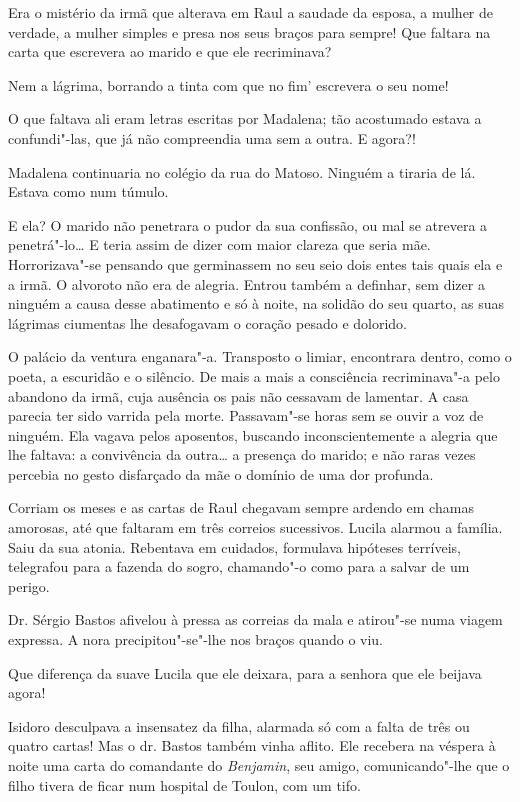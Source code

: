 Era o mistério da irmã que alterava em Raul a saudade da esposa, a
mulher de verdade, a mulher simples e presa nos seus braços para sempre!
Que faltara na carta que escrevera ao marido e que ele recriminava?

Nem a lágrima, borrando a tinta com que no
fim' escrevera o seu nome!

O que faltava ali eram letras escritas por Madalena; tão acostumado
estava a confundi"-las, que já não compreendia uma sem a outra. E agora?!

Madalena continuaria no colégio da rua do Matoso. Ninguém a tiraria de
lá. Estava como num túmulo.

E ela? O marido não penetrara o pudor da sua confissão, ou mal se
atrevera a penetrá"-lo\ldots{} E teria assim de dizer com maior clareza que
seria mãe. Horrorizava"-se pensando que germinassem no seu seio dois
entes tais quais ela e a irmã. O alvoroto não era de alegria. Entrou
também a definhar, sem dizer a ninguém a causa desse abatimento e só à
noite, na solidão do seu quarto, as suas lágrimas ciumentas lhe
desafogavam o coração pesado e dolorido.

O palácio da ventura enganara"-a. Transposto o limiar, encontrara dentro,
como o poeta, a escuridão e o silêncio. De mais a mais a consciência
recriminava"-a pelo abandono da irmã, cuja ausência os pais não cessavam
de lamentar. A casa parecia ter sido varrida pela morte. Passavam"-se
horas sem se ouvir a voz de ninguém. Ela vagava pelos aposentos,
buscando inconscientemente a alegria que lhe faltava: a convivência da
outra\ldots{} a presença do marido; e não raras vezes percebia no gesto
disfarçado da mãe o domínio de uma dor profunda.

Corriam os meses e as cartas de Raul chegavam sempre ardendo em chamas
amorosas, até que faltaram em três correios sucessivos. Lucila alarmou a
família. Saiu da sua atonia. Rebentava em cuidados, formulava hipóteses
terríveis, telegrafou para a fazenda do sogro, chamando"-o como para a
salvar de um perigo.

Dr. Sérgio Bastos afivelou à pressa as correias da mala e atirou"-se numa
viagem expressa. A nora precipitou"-se"-lhe nos braços quando o viu.

Que diferença da suave Lucila que ele deixara, para a senhora que ele
beijava agora!

Isidoro desculpava a insensatez da filha, alarmada só com a falta de
três ou quatro cartas! Mas o dr. Bastos também vinha aflito. Ele
recebera na véspera à noite uma carta do comandante do \emph{Benjamin},
seu amigo, comunicando"-lhe que o filho tivera de ficar num hospital de
Toulon, com um tifo.

